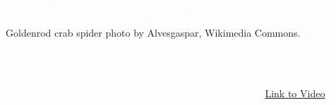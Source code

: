 \documentclass[t]{beamer}
\begin{document}
{
\begin{frame}[t,plain]
\end{frame}
}

{
\begin{frame}[b,plain]
	\textcolor{white}{\Tiny Sunflowers by Trey Ratcliff, Flickr, Creative Commons.}
\end{frame}
}

{
\begin{frame}[b,plain]
\Tiny Goldenrod crab spider photo by Alvesgaspar, Wikimedia Commons.
\end{frame}
}

{
\begin{frame}[b,plain]
	\textcolor{white}{\Tiny Marine iguana on San Crist\'{o}bal Island, Galapagos by Les Williams, Flickr, Creative Commons.}
\end{frame}
}

{
\begin{frame}[b,plain]
	\Tiny\textcolor{white}{Greater Bird of Paradise \textcopyright Tim Laman, All Rights Reserved. \href{http://www.youtube.com/watch?v=KIYkpwyKEhY}{Link to Video} }
\end{frame}
}

%
%
%
%
\end{document}
